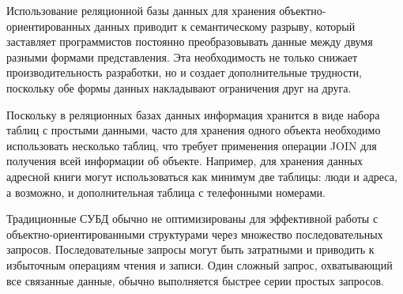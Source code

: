 
        Использование реляционной базы данных для хранения объектно-ориентированных данных приводит к семантическому разрыву, который заставляет программистов постоянно преобразовывать данные между двумя разными формами представления. Эта необходимость не только снижает производительность разработки, но и создает дополнительные трудности, поскольку обе формы данных накладывают ограничения друг на друга.

        Поскольку в реляционных базах данных информация хранится в виде набора таблиц с простыми данными, часто для хранения одного объекта необходимо использовать несколько таблиц, что требует применения операции JOIN для получения всей информации об объекте. Например, для хранения данных адресной книги могут использоваться как минимум две таблицы: люди и адреса, а возможно, и дополнительная таблица с телефонными номерами.

        Традиционные СУБД обычно не оптимизированы для эффективной работы с объектно-ориентированными структурами через множество последовательных запросов. Последовательные запросы могут быть затратными и приводить к избыточным операциям чтения и записи. Один сложный запрос, охватывающий все связанные данные, обычно выполняется быстрее серии простых запросов.
